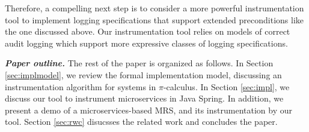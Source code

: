 Therefore, a compelling next step is to consider a more powerful instrumentation tool to implement logging specifications that support extended preconditions like the one discussed above. Our instrumentation tool relies on models of correct audit logging which support more expressive classes of logging specifications.




\textbf{\textit{Paper outline.}}
The rest of the paper is organized as follows. In Section \ref{sec:implmodel}, we review the formal implementation model, discussing an instrumentation algorithm for systems in $\pi$-calculus. In Section \ref{sec:impl}, we discuss our tool to instrument microservices in Java Spring. In addition, we present a demo of a microservices-based MRS, and its instrumentation by our tool. 
Section \ref{sec:rwc} disucsses the related work and concludes the paper.